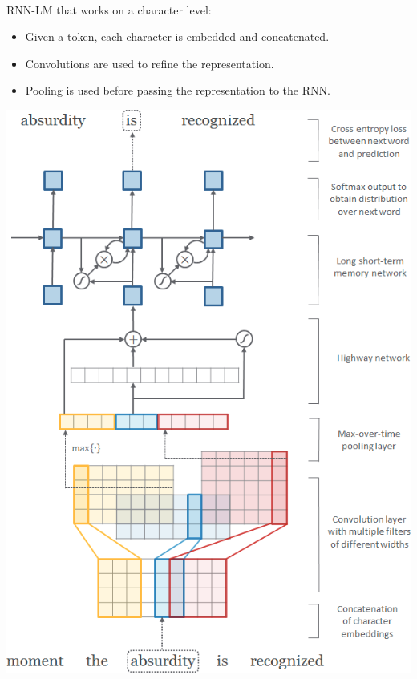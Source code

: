 \begin{example}
    \phantom{}\\
    \begin{minipage}{0.6\linewidth}
        RNN-LM that works on a character level:
        \begin{itemize}
            \item Given a token, each character is embedded and concatenated.
            \item Convolutions are used to refine the representation.
            \item Pooling is used before passing the representation to the RNN.
        \end{itemize}
    \end{minipage}
    \begin{minipage}{0.35\linewidth}
        \centering
        \includegraphics[width=0.95\linewidth]{./img/char_aware_rnn_cnn.png}
    \end{minipage}


\end{example}



